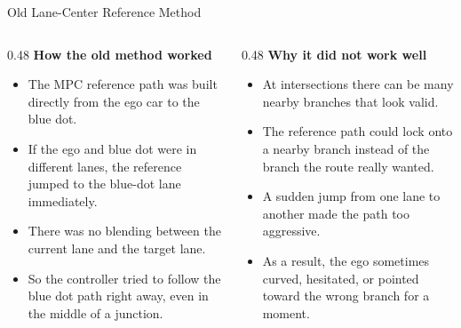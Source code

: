 \documentclass[aspectratio=169]{beamer}
\begin{document}
\begin{frame}{Old Lane-Center Reference Method}
\small
\begin{columns}[T,onlytextwidth]
\begin{column}{0.48\textwidth}
\textbf{How the old method worked}
\begin{itemize}
\setlength\itemsep{0.45em}
\item The MPC reference path was built directly from the ego car to the blue dot.
\item If the ego and blue dot were in different lanes, the reference jumped to the blue-dot lane immediately.
\item There was no blending between the current lane and the target lane.
\item So the controller tried to follow the blue dot path right away, even in the middle of a junction.
\end{itemize}
\end{column}

\begin{column}{0.48\textwidth}
\textbf{Why it did not work well}
\begin{itemize}
\setlength\itemsep{0.45em}
\item At intersections there can be many nearby branches that look valid.
\item The reference path could lock onto a nearby branch instead of the branch the route really wanted.
\item A sudden jump from one lane to another made the path too aggressive.
\item As a result, the ego sometimes curved, hesitated, or pointed toward the wrong branch for a moment.
\end{itemize}
\end{column}
\end{columns}
\end{frame}
\end{document}
